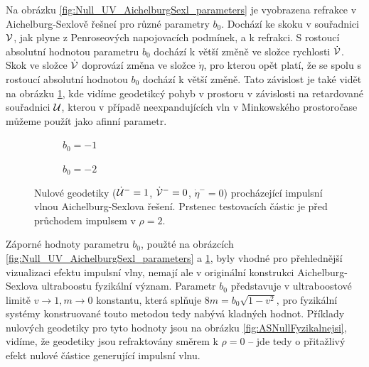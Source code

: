 Na obrázku \ref{fig:Null_UV_AichelburgSexl_parameters} je vyobrazena refrakce v Aichelburg-Sexlově řešneí pro různé
parametry $b_0$. Dochází ke skoku v souřadnici $\mathcal{V}$, jak plyne z Penroseových napojovacích podmínek, a k refrakci.
S rostoucí absolutní hodnotou parametru $b_0$ dochází k větší změně ve složce rychlosti $\dot {\mathcal{V}}$.
Skok ve složce $\dot {\mathcal{V}}$ doprovází změna ve složce $\dot \eta$, pro kterou opět platí, že se spolu s
rostoucí absolutní hodnotou $b_0$ dochází k větší změně. Tato závislost je také vidět na obrázku \ref{fig:NullASRing01},
kde vidíme geodetikcý pohyb v prostoru v závislosti na retardované souřadnici $\mathcal{U}$, kterou v případě neexpandujících vln
v Minkowského prostoročase můžeme použít jako afinní parametr.

\begin{figure}[h]
    \centering
    \begin{subfigure}[b]{0.45\textwidth}
        \caption{$b_0 = -1$}
    \end{subfigure}
    \hfill
    \begin{subfigure}[b]{0.45\textwidth}
        \caption{$b_0 = -2$}
    \end{subfigure}
    \caption{Nulové geodetiky ($\dot {\mathcal{U}}^-=1$, $\dot {\mathcal{V}}^-=0$, $\dot \eta^-=0$) procházející impulsní vlnou Aichelburg-Sexlova řešení. Prstenec testovacích částic je před průchodem impulsem v $\rho=2$.}
    \label{fig:NullASRing01}
\end{figure}

Záporné hodnoty parametru $b_0$, použté na obrázcích \ref{fig:Null_UV_AichelburgSexl_parameters} a \ref{fig:NullASRing01}, byly vhodné pro přehlednější vizualizaci
efektu impulsní vlny, nemají ale v originální konstrukci Aichelburg-Sexlova ultraboostu fyzikální význam. Parametr $b_0$
představuje v ultraboostové limitě $v \to 1, m \to 0$ konstantu, která splňuje $8m = b_0\sqrt{1-v^2}$, pro fyzikální systémy konstruované touto metodou
tedy nabývá kladných hodnot. Příklady nulových geodetiky pro tyto hodnoty jsou na obrázku \ref{fig:ASNullFyzikalnejsi}, vidíme,
že geodetiky jsou refraktovány směrem k $\rho=0$ -- jde tedy o přitažlivý efekt nulové částice generující impulsní vlnu.

